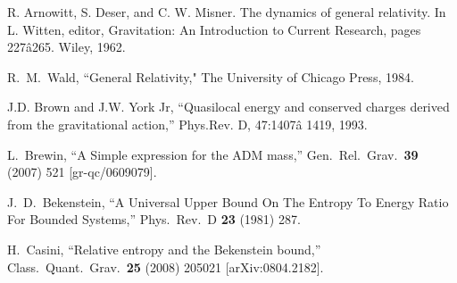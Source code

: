 \documentclass[a4paper,12pt]{article}
\begin{document}
\begin{thebibliography}{100}
 R. Arnowitt, S. Deser, and C. W. Misner. The dynamics of general relativity. In L. Witten, editor, Gravitation: An Introduction to Current Research, pages 227â265. Wiley, 1962.


R.~M.~Wald,
``General Relativity,"
The University of Chicago Press, 1984.


 
  
  J.D. Brown and J.W. York Jr, ``Quasilocal energy and conserved charges derived from the gravitational action,'' Phys.Rev. D, 47:1407â 1419, 1993.


  L.~Brewin,
  ``A Simple expression for the ADM mass,''
  Gen.\ Rel.\ Grav.\  {\bf 39} (2007) 521
  [gr-qc/0609079].

 J.~D.~Bekenstein,
 ``A Universal Upper Bound On The Entropy To Energy Ratio For Bounded
 Systems,''
 Phys.\ Rev.\  D {\bf 23} (1981) 287.
 

  H.~Casini,
  ``Relative entropy and the Bekenstein bound,''
  Class.\ Quant.\ Grav.\  {\bf 25} (2008) 205021
  [arXiv:0804.2182].












\end{thebibliography}
\end{document}
